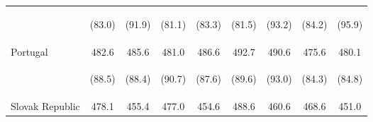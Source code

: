 \begin{center}
\begin{tabular}{lcccccccc}
 & \begin{footnotesize}(83.0)\end{footnotesize} & \begin{footnotesize}(91.9)\end{footnotesize} & \begin{footnotesize}(81.1)\end{footnotesize} & \begin{footnotesize}(83.3)\end{footnotesize} & \begin{footnotesize}(81.5)\end{footnotesize} & \begin{footnotesize}(93.2)\end{footnotesize} & \begin{footnotesize}(84.2)\end{footnotesize} & \begin{footnotesize}(95.9)\end{footnotesize}\\
\noalign{\smallskip}Portugal & 482.6 & 485.6 & 481.0 & 486.6 & 492.7 & 490.6 & 475.6 & 480.1\\
 & \begin{footnotesize}(88.5)\end{footnotesize} & \begin{footnotesize}(88.4)\end{footnotesize} & \begin{footnotesize}(90.7)\end{footnotesize} & \begin{footnotesize}(87.6)\end{footnotesize} & \begin{footnotesize}(89.6)\end{footnotesize} & \begin{footnotesize}(93.0)\end{footnotesize} & \begin{footnotesize}(84.3)\end{footnotesize} & \begin{footnotesize}(84.8)\end{footnotesize}\\
\noalign{\smallskip}Slovak Republic & 478.1 & 455.4 & 477.0 & 454.6 & 488.6 & 460.6 & 468.6 & 451.0\\

\end{tabular}
\end{center}
